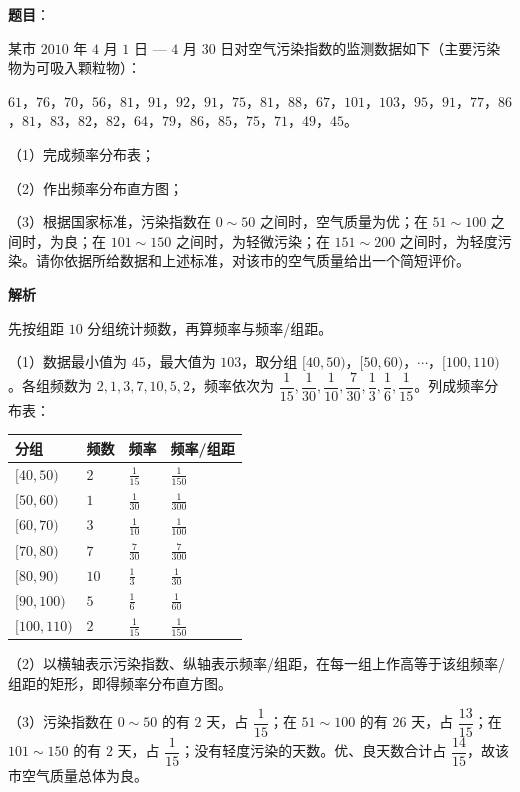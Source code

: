 \begin{answer}

\textbf{题目}：

某市 $2010$ 年 $4$ 月 $1$ 日 — $4$ 月 $30$ 日对空气污染指数的监测数据如下（主要污染物为可吸入颗粒物）：

$61$，$76$，$70$，$56$，$81$，$91$，$92$，$91$，$75$，$81$，$88$，$67$，$101$，$103$，$95$，$91$，$77$，$86$，$81$，$83$，$82$，$82$，$64$，$79$，$86$，$85$，$75$，$71$，$49$，$45$。

（1）完成频率分布表；

（2）作出频率分布直方图；

（3）根据国家标准，污染指数在 $0\sim50$ 之间时，空气质量为优；在 $51\sim100$ 之间时，为良；在 $101\sim150$ 之间时，为轻微污染；在 $151\sim200$ 之间时，为轻度污染。请你依据所给数据和上述标准，对该市的空气质量给出一个简短评价。

\textbf{解析}

先按组距 $10$ 分组统计频数，再算频率与频率/组距。

（1）数据最小值为 $45$，最大值为 $103$，取分组 $[40,50)$，$[50,60)$，$\cdots$，$[100,110)$。各组频数为 $2,1,3,7,10,5,2$，频率依次为 $\dfrac1{15},\dfrac1{30},\dfrac1{10},\dfrac7{30},\dfrac13,\dfrac16,\dfrac1{15}$。列成频率分布表：

\begin{center}
\begin{tabular}{llll}
\toprule
分组 & 频数 & 频率 & 频率/组距 \\
\midrule
$[40,50)$ & $2$ & $\frac1{15}$ & $\frac1{150}$ \\
$[50,60)$ & $1$ & $\frac1{30}$ & $\frac1{300}$ \\
$[60,70)$ & $3$ & $\frac1{10}$ & $\frac1{100}$ \\
$[70,80)$ & $7$ & $\frac7{30}$ & $\frac7{300}$ \\
$[80,90)$ & $10$ & $\frac13$ & $\frac1{30}$ \\
$[90,100)$ & $5$ & $\frac16$ & $\frac1{60}$ \\
$[100,110)$ & $2$ & $\frac1{15}$ & $\frac1{150}$ \\
\bottomrule
\end{tabular}
\end{center}

（2）以横轴表示污染指数、纵轴表示频率/组距，在每一组上作高等于该组频率/组距的矩形，即得频率分布直方图。

（3）污染指数在 $0\sim50$ 的有 $2$ 天，占 $\dfrac1{15}$；在 $51\sim100$ 的有 $26$ 天，占 $\dfrac{13}{15}$；在 $101\sim150$ 的有 $2$ 天，占 $\dfrac1{15}$；没有轻度污染的天数。优、良天数合计占 $\dfrac{14}{15}$，故该市空气质量总体为良。


\end{answer}
